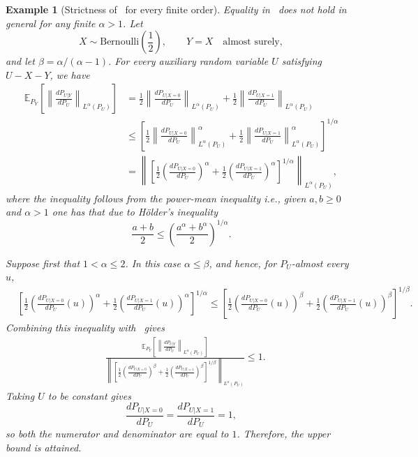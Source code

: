 \documentclass{article}
\numberwithin{theorem}{section}
\newtheorem{example}{Example}
\numberwithin{example}{section}
\numberwithin{remark}{section}
\numberwithin{definition}{section}
\begin{document}
\begin{example}[Strictness of~ for every finite order]
Equality in~ does not hold in general for any finite $\alpha>1$. Let
\[
X\sim\mathrm{Bernoulli}\left(\frac12\right),
\qquad
Y=X \quad\text{almost surely},
\]
and let $\beta=\alpha/(\alpha-1)$. For every auxiliary random variable $U$ satisfying $U-X-Y$, we have
\begin{align}
\mathbb{E}_{P_Y}\left[
\left\|
\frac{dP_{U|Y}}{dP_U}
\right\|_{L^\alpha(P_U)}
\right] &=
\frac12
\left\|
\frac{dP_{U|X=0}}{dP_U}
\right\|_{L^\alpha(P_U)}
+
\frac12
\left\|
\frac{dP_{U|X=1}}{dP_U}
\right\|_{L^\alpha(P_U)}
\nonumber\\
&\leq
\left[
\frac12
\left\|
\frac{dP_{U|X=0}}{dP_U}
\right\|_{L^\alpha(P_U)}^\alpha
+
\frac12
\left\|
\frac{dP_{U|X=1}}{dP_U}
\right\|_{L^\alpha(P_U)}^\alpha
\right]^{1/\alpha}
\nonumber\\
&=
\left\|
\left[
\frac12
\left(\frac{dP_{U|X=0}}{dP_U}\right)^\alpha
+
\frac12
\left(\frac{dP_{U|X=1}}{dP_U}\right)^\alpha
\right]^{1/\alpha}
\right\|_{L^\alpha(P_U)},
\label{eq:counterexample-power-mean}
\end{align}
where the inequality follows from the power-mean inequality \textit{i.e.}, given $a,b\geq 0$ and $\alpha>1$ one has that due to H\"older's inequality
\begin{equation}
    \frac{a+b}{2} \leq \left(\frac{a^\alpha+b^\alpha}{2}\right)^{1/\alpha}.
\end{equation}

Suppose first that $1<\alpha\leq2$. In this case $\alpha\leq\beta$, and hence, for $P_U$-almost every $u$,
\begin{align}
&\left[
\frac12
\left(\frac{dP_{U|X=0}}{dP_U}(u)\right)^\alpha
+
\frac12
\left(\frac{dP_{U|X=1}}{dP_U}(u)\right)^\alpha
\right]^{1/\alpha}\leq
\left[
\frac12
\left(\frac{dP_{U|X=0}}{dP_U}(u)\right)^\beta
+
\frac12
\left(\frac{dP_{U|X=1}}{dP_U}(u)\right)^\beta
\right]^{1/\beta}.
\end{align}
Combining this inequality with~ gives
\begin{align}
&\frac{
\mathbb{E}_{P_Y}\left[
\left\|
\frac{dP_{U|Y}}{dP_U}
\right\|_{L^\alpha(P_U)}
\right]
}{
\left\|
\left[
\frac12
\left(\frac{dP_{U|X=0}}{dP_U}\right)^\beta
+
\frac12
\left(\frac{dP_{U|X=1}}{dP_U}\right)^\beta
\right]^{1/\beta}
\right\|_{L^\alpha(P_U)}
}
\leq1.
\end{align}
Taking $U$ to be constant gives
\[
\frac{dP_{U|X=0}}{dP_U}
=
\frac{dP_{U|X=1}}{dP_U}
=1,
\]
so both the numerator and denominator are equal to $1$. Therefore, the upper bound is attained.


\end{example}
\end{document}
